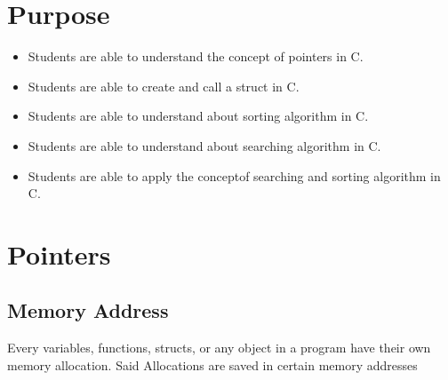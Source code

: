 \section{Purpose}
\begin{itemize}[label=$\bullet$, itemsep=-1pt, leftmargin=*]   
    \item Students are able to understand the concept of pointers in C.
    \item Students are able to create and call a struct in C.
    \item Students are able to understand about sorting algorithm in C.
    \item Students are able to understand about searching algorithm in C.
    \item Students are able to apply the conceptof searching and sorting algorithm in C.
\end{itemize}

\section{Pointers}
\subsection{Memory Address}
Every variables, functions, structs, or any object in a program have their own memory allocation. 
Said Allocations are saved in certain memory addresses

